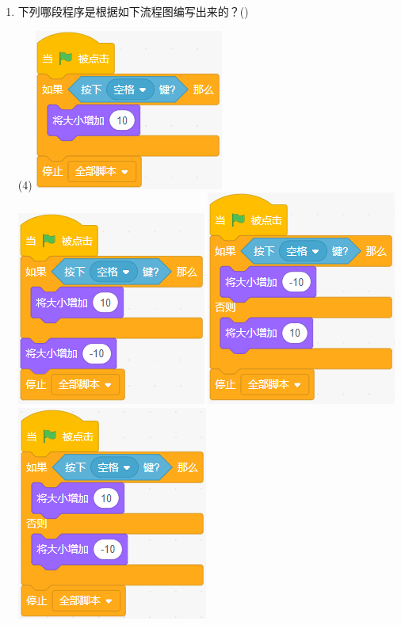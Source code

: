 \documentclass[10pt, a4paper]{article}
\newcommand{\hq}{\hfill(\qquad)}
\begin{document}
\begin{enumerate}
        \item 下列哪段程序是根据如下流程图编写出来的？\hq
        \begin{tasks}(4)
            \task \includegraphics[width=.18\textwidth]{figure/23a.png}
            \task \includegraphics[width=.15\textwidth]{figure/23b.png}
            \task \includegraphics[width=.14\textwidth]{figure/23c.png}
            \task \includegraphics[width=.15\textwidth]{figure/23d.png}
        \end{tasks}


\end{enumerate}
\end{document}

